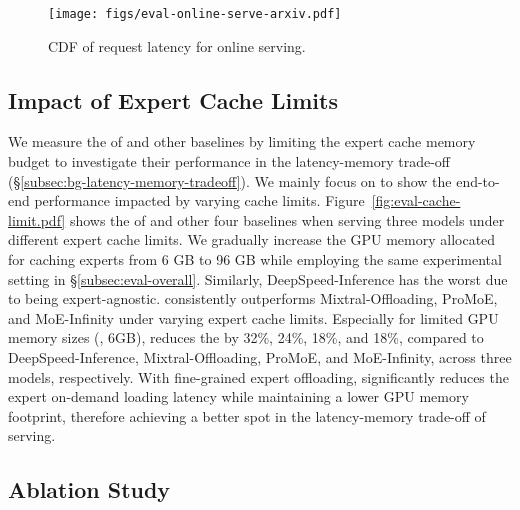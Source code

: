 \begin{figure}[t]
  \centering
  \texttt{[image: figs/eval-online-serve-arxiv.pdf]}
  \vspace{-0.15in}
  \caption{CDF of request latency for \MoE online serving.}
  \vspace{-0.2in}
  \label{fig:eval-online-serve}
\end{figure}



\subsection{Impact of Expert Cache Limits}



We measure the \TPOT of \sys and other baselines by limiting the expert cache memory budget to investigate their performance in the latency-memory trade-off (\S\ref{subsec:bg-latency-memory-tradeoff}).
We mainly focus on \TPOT to show the end-to-end performance impacted by varying cache limits.
Figure~\ref{fig:eval-cache-limit.pdf} shows the \TPOT of \sys and other four baselines when serving three \MoE models under different expert cache limits.
We gradually increase the GPU memory allocated for caching experts from 6 GB to 96 GB while employing the same experimental setting in \S\ref{subsec:eval-overall}.
Similarly, DeepSpeed-Inference has the worst \TPOT due to being expert-agnostic.
\sys consistently outperforms Mixtral-Offloading, ProMoE, and MoE-Infinity under varying expert cache limits.
Especially for limited GPU memory sizes (\eg, 6GB), \sys reduces the \TPOT by 32\%, 24\%, 18\%, and 18\%, compared to DeepSpeed-Inference, Mixtral-Offloading, ProMoE, and MoE-Infinity, across three \MoE models, respectively.
With fine-grained expert offloading, \sys significantly reduces the expert on-demand loading latency while maintaining a lower GPU memory footprint, therefore achieving a better spot in the latency-memory trade-off of \MoE serving.


\subsection{Ablation Study}
\label{subsec:eval-ablation}





